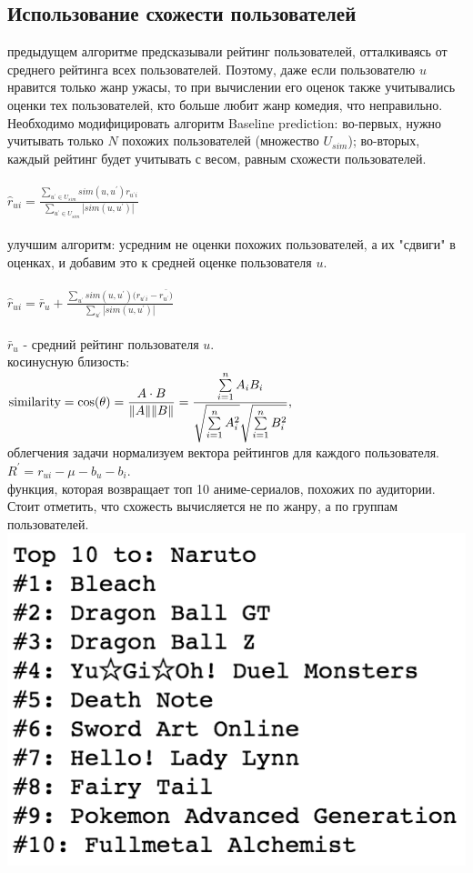 \documentclass{article}
\newcommand\tab[1][1cm]{\hspace*{#1}}
\begin{document}
\subsection{Использование схожести пользователей}
 предыдущем алгоритме предсказывали рейтинг пользователей, отталкиваясь от среднего рейтинга всех пользователей. Поэтому, даже если пользователю $u$ нравится только жанр ужасы, то при вычислении его оценок также учитывались оценки тех пользователей, кто больше любит жанр комедия, что неправильно. Необходимо модифицировать алгоритм Baseline prediction: во-первых, нужно учитывать только $N$ похожих пользователей (множество $U_{sim}$); во-вторых, каждый рейтинг будет учитывать с весом, равным схожести пользователей.\\
\\
\tab$\hat{r}_{ui}=\frac{\sum_{u^\prime \in U_{sim}}sim(u,u^\prime)r_{u^\prime{}i}}{\sum_{u^\prime\in U_{sim}}|sim(u,u^\prime)|}$\\
\\
 улучшим алгоритм: усредним не оценки похожих пользователей, а их "сдвиги" в оценках, и добавим это к средней оценке пользователя $u$.\\
\\
\tab$\hat{r}_{ui}=\bar{r}_u+\frac{\sum_{u^\prime}sim(u,u^\prime)(r_{u^\prime{}i}-\bar{r_{u^\prime})}}{\sum_{u^\prime}|sim(u,u^\prime)|}$\\
\\
 $\bar{r}_u$ - средний рейтинг пользователя $u$.\\
 косинусную близость:\\
\tab${\displaystyle {\text{similarity}}=\cos(\theta )={ A  \cdot  B   \over \| A  \|\| B \|}={\frac {\sum \limits _{i=1}^{n}{A_{i}B_{i}}}{{\sqrt {\sum \limits _{i=1}^{n}{A_{i}^{2}}}}{\sqrt {\sum \limits _{i=1}^{n}{B_{i}^{2}}}}}},}$\\
 облегчения задачи нормализуем вектора рейтингов для каждого пользователя.\\
\tab$R^\prime=r_{ui}-\mu-b_u-b_i.$\\
 функция, которая возвращает топ 10 аниме-сериалов, похожих по аудитории. Стоит отметить, что схожесть вычисляется не по жанру, а по группам пользователей.\\
\includegraphics[scale=0.8]{f16.png}\\
\end{document}
